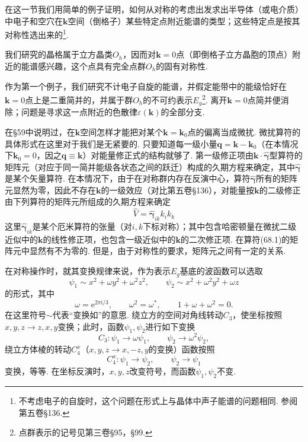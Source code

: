 在这一节我们用简单的例子证明，如何从对称的考虑出发求出半导体（或电介质）中电子和空穴在$\bm{k}$空间（倒格子）某些特定点附近能谱的类型；这些特定点是按其对称性选出来的\footnote{不考虑电子的自旋时，这个问题在形式上与晶体中声子能谱的问题相同. 参阅第五卷§136.}.

我们研究的晶格属于立方晶类$O_h$，因而对$\bm{k}=0$点（即倒格子立方晶胞的顶点）附近的能谱感兴趣，这个点具有完全点群$O_h$的固有对称性.

作为第一个例子，我们研究不计电子自旋的能谱，并假定能带中的能级恰好在$\bm{k}=0$点上是二重简并的，并属于群$O_h$的不可约表示$E_g$\footnote{点群表示的记号见第三卷§95，§99.}. 离开$\bm{k}=0$点简并便消除；问题是寻求这一点附近的色散律$\varepsilon(\bm{k})$的全部分支.

在§59中说明过，在$\bm{k}$空间怎样才能把对某个$\bm{k}=\bm{k}_0$点的偏离当成微扰. 微扰算符的具体形式在这里对于我们是无紧要的. 只要知道每一级小量$\bm{q}=\bm{k}-\bm{k}_0$（在本情况下$\bm{k}_0=0$，因之$\bm{q}\equiv\bm{k}$）对能量修正式的结构就够了. 第一级修正项由$\bm{k}\cdot\hat{\bm{\gamma}}$型算符的矩阵元（对应于同一简并能级各状态之间的跃迁）构成的久期方程来确定，其中$\hat{\bm{\gamma}}$是某个矢量算符. 在本情况下，由于在对称群内存在反演中心，算符$\hat{\bm{\gamma}}$所有的矩阵元显然为零，因此不存在$\bm{k}$的一级效应（对比第五卷§136），对能量按$\bm{k}$的二级修正由下列算符的矩阵元所组成的久期方程来确定
\begin{equation}
\hat{V}=\hat{\bm{\gamma}}_{ik}k_ik_k
\end{equation}
这里$\hat{\bm{\gamma}}_{ik}$是某个厄米算符的张量（对$i,k$下标对称）；其中包含哈密顿量在微扰二级近似中的$\bm{k}$的线性修正项，也包含一级近似中的$\bm{k}$的二次修正项. 在算符(68.1)的矩阵元中显然有不为零的. 但是，由于对称性的要求，矩阵元之间有一定的关系.

在对称操作时，就其变换规律来说，作为表示$E_g$基底的波函数可以选取
\begin{equation*}
\psi_1\sim x^2+\omega y^2+\omega^2z^2,\qquad
\psi_2\sim x^2+\omega^2y^2+\omega z
\end{equation*}
的形式，其中
\begin{equation*}
\omega=\mathrm{e}^{2\pi\mathrm{i}/3},\qquad
\omega^2=\omega^*,\qquad 1+\omega+\omega^2=0.
\end{equation*}
在这里符号$\sim$代表“变换如”的意思. 绕立方的空间对角线转动$C_3$，使坐标按照$x,y,z\to z,x,y$变换；此时，函数$\psi_1,\psi_2$进行如下变换
\begin{equation*}
C_3\colon \psi_1\to\omega\psi_1,\qquad \psi_2\to\omega^2\psi_2,
\end{equation*}
绕立方体棱的转动$C^x_4$（$x,y,z\to x,-z,y$的变换）函数按照
\begin{equation*}
C^x_4\colon \psi_1\to\psi_2,\qquad \psi_2\to\psi_1
\end{equation*}
变换，等等. 在坐标反演时，$x,y,z$改变符号，而函数$\psi_1,\psi_2$不变.

